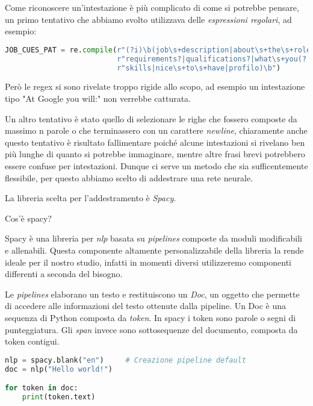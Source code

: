 \medskip

\noindent Come riconoscere un'intestazione è più complicato di come si potrebbe pensare, un primo tentativo che abbiamo svolto utilizzava delle \textit{espressioni regolari}, ad esempio:

\begin{lstlisting}[language=python,style=python]
JOB_CUES_PAT = re.compile(r"(?i)\b(job\s+description|about\s+the\s+role|responsabilit|activit|"
                          r"requirements?|qualifications?|what\s+you(?:'|)ll\s+(do|be\s+doing)|"
                          r"skills|nice\s+to\s+have|profilo)\b")
\end{lstlisting}

\noindent Però le regex si sono rivelate troppo rigide allo scopo, ad esempio un intestazione tipo "At Google you will:" non verrebbe catturata.

\medskip

\noindent Un altro tentativo è stato quello di selezionare le righe che fossero composte da massimo n parole o che terminassero con un carattere \textit{newline}, chiaramente anche questo tentativo è risultato fallimentare poiché alcune intestazioni si rivelano ben più lunghe di quanto si potrebbe immaginare, mentre altre frasi brevi potrebbero essere confuse per intestazioni. Dunque ci serve un metodo che sia sufficentemente flessibile, per questo abbiamo scelto di addestrare una rete neurale.

\medskip

\noindent La libreria scelta per l'addestramento è \textit{Spacy}.

\medskip

\noindent Cos'è spacy?

\noindent Spacy è una libreria per \textit{nlp} basata su \textit{pipelines} composte da moduli modificabili e allenabili. Questa componente altamente personalizzabile della libreria la rende ideale per il nostro studio, infatti in momenti diversi utilizzeremo componenti differenti a seconda del bisogno.

\noindent Le \textit{pipelines} elaborano un testo e restituiscono un \textit{Doc}, un oggetto che permette di accedere alle informazioni del testo ottenute dalla pipeline. Un Doc è una sequenza di Python composta da \textit{token}. In spacy i token sono parole o segni di punteggiatura.
\noindent Gli \textit{span} invece sono sottosequenze del documento, composta da token contigui.

\begin{lstlisting}[language=python]
nlp = spacy.blank("en")     # Creazione pipeline default
doc = nlp("Hello world!")

for token in doc:
    print(token.text)
\end{lstlisting}

